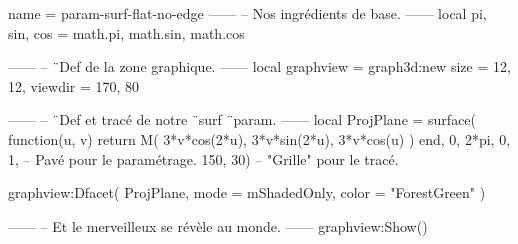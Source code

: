 \documentclass{standalone}
\begin{document}
\begin{luadraw}{name = param-surf-flat-no-edge}
------
-- Nos ingrédients de base.
------
local pi, sin, cos = math.pi, math.sin, math.cos

------
-- ¨Def de la zone graphique.
------
local graphview = graph3d:new{
  size    = {12, 12},
  viewdir = {170, 80}
}

------
-- ¨Def et tracé de notre ¨surf ¨param.
------
local ProjPlane =  surface(
  function(u, v)
    return M(
      3*v*cos(2*u),
      3*v*sin(2*u),
      3*v*cos(u)
    )
  end,
  0, 2*pi, 0, 1,  -- Pavé pour le paramétrage.
  {150, 30})      -- "Grille" pour le tracé.

graphview:Dfacet(
  ProjPlane,
  {
    mode  = mShadedOnly,
    color = "ForestGreen"
  })

------
-- Et le merveilleux se révèle au monde.
------
graphview:Show()
\end{luadraw}
\end{document}
